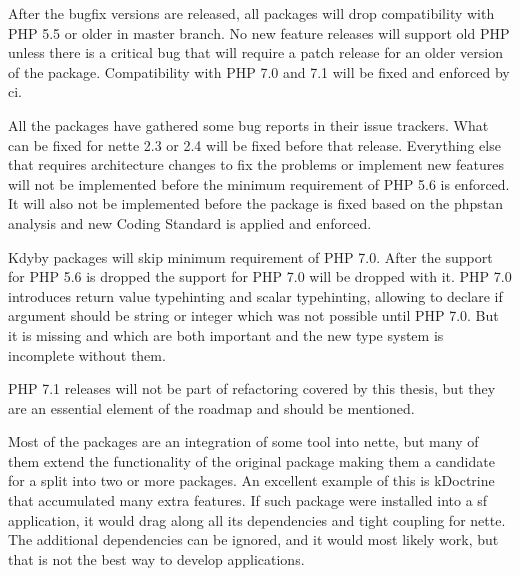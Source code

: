 
After the bugfix versions are released, all packages will drop compatibility with PHP 5.5 or older in master branch. No new feature releases will support old PHP unless there is a critical bug that will require a patch release for an older version of the package. Compatibility with PHP 7.0 and 7.1 will be fixed and enforced by \gls{ci}.

All the packages have gathered some bug reports in their issue trackers. What can be fixed for \gls{nette} 2.3 or 2.4 will be fixed before that release. Everything else that requires architecture changes to fix the problems or implement new features will not be implemented before the minimum requirement of PHP 5.6 is enforced. It will also not be implemented before the package is fixed based on the \gls{phpstan} analysis and new Coding Standard is applied and enforced.


Kdyby packages will skip minimum requirement of PHP 7.0. After the support for PHP 5.6 is dropped the support for PHP 7.0 will be dropped with it. PHP 7.0 introduces return value typehinting and scalar typehinting, allowing to declare if argument should be string or integer which was not possible until PHP 7.0. But it is missing  and  which are both important and the new type system is incomplete without them.

PHP 7.1 releases will not be part of refactoring covered by this thesis, but they are an essential element of the roadmap and should be mentioned.


Most of the packages are an integration of some tool into \gls{nette}, but many of them extend the functionality of the original package making them a candidate for a split into two or more packages. An excellent example of this is \gls{kDoctrine} that accumulated many extra features. If such package were installed into a \gls{sf} application, it would drag along all its dependencies and tight coupling for \gls{nette}. The additional dependencies can be ignored, and it would most likely work, but that is not the best way to develop applications.


